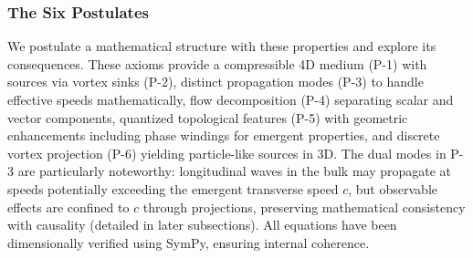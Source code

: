 \subsubsection{The Six Postulates}

We postulate a mathematical structure with these properties and explore its consequences. These axioms provide a compressible 4D medium (P-1) with sources via vortex sinks (P-2), distinct propagation modes (P-3) to handle effective speeds mathematically, flow decomposition (P-4) separating scalar and vector components, quantized topological features (P-5) with geometric enhancements including phase windings for emergent properties, and discrete vortex projection (P-6) yielding particle-like sources in 3D. The dual modes in P-3 are particularly noteworthy: longitudinal waves in the bulk may propagate at speeds potentially exceeding the emergent transverse speed $c$, but observable effects are confined to $c$ through projections, preserving mathematical consistency with causality (detailed in later subsections). All equations have been dimensionally verified using SymPy, ensuring internal coherence.

